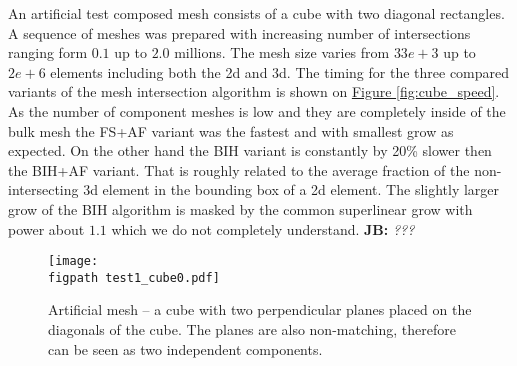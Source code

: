 \documentclass{elsarticle}
\newcommand{\fig}[1]{\hyperref[#1]{Figure \ref{#1}}}
\newcommand{\figpath}{figures/}
\newcommand{\noteJB}[1]{{\color{Blue} \textbf{JB: } \textit{#1}}}
\newcommand{\notePE}[1]{{\color{Orange} \textbf{PE: } \textit{#1}}}
\begin{document}
% 

An artificial test composed mesh consists of a cube with two diagonal rectangles. A sequence of meshes was prepared with increasing number of intersections ranging
form $0.1$ up to $2.0$ millions. The mesh size varies from $33e+3$ up to $2e+6$ elements including both the 2d and 3d. The timing for the three compared variants
of the mesh intersection algorithm is shown on \fig{fig:cube_speed}. As the number of component meshes is low and they are completely 
inside of the bulk mesh the FS+AF variant was the fastest and with smallest grow as expected. On the other hand the BIH variant is constantly by 20\%
slower then the BIH+AF variant. That is roughly related to the average fraction of the non-intersecting 3d element in the bounding box of a 2d element.
The slightly larger grow of the BIH algorithm is masked by the common superlinear grow with power about $1.1$ which we do not completely understand.
\noteJB{???}


\begin{figure}[!htb]
    \centering
    \texttt{[image: \\figpath test1\_cube0.pdf]}
    \caption{Artificial mesh -- a cube with two perpendicular planes placed on the diagonals of the cube.
             The planes are also non-matching, therefore can be seen as two independent components.}
    \label{fig:cube_mesh}
\end{figure}
  
\end{document}
